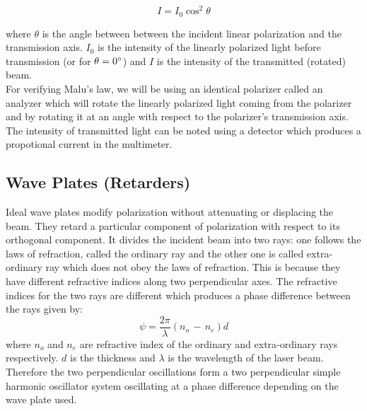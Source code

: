 		\begin{equation}
			I= I_0 \cos^2{\theta}
			\label{eqn:1}
		\end{equation}
		
		where $\theta$ is the angle between between the incident linear polarization and the transmission axis. $I_0$ is the intensity of the linearly polarized light before transmission (or for $\theta=0\degree$) and $I$ is the intensity of the transmitted (rotated) beam. \\

		\vspace{-3mm}
		For verifying Malu's law, we will be using an identical polarizer called an analyzer which will rotate the linearly polarized light coming from the polarizer and by rotating it at an angle with respect to the polarizer's transmission axis. The intensity of transmitted light can be noted using a detector which produces a propotional current in the multimeter.

	\subsection{Wave Plates (Retarders)}

		Ideal wave plates modify polarization without attenuating or displacing the beam. They retard a particular component of polarization with respect to its orthogonal component. It divides the incident beam into two rays:  one follows the laws of refraction, called the ordinary ray and the other one is called extra-ordinary ray which does not obey the laws of refraction. This is because they have different refractive indices along two perpendicular axes. The refractive indices for the two rays are different which produces a phase difference between the rays given by:
		$$ \psi = \frac{2\pi}{\lambda}(n_o\,-\,n_e)d$$
		where $n_o$ and $n_e$ are refractive index of the ordinary and extra-ordinary rays respectively. $d$ is the thickness and $\lambda$ is the wavelength of the laser beam. Therefore the two perpendicular oscillations form a two perpendicular simple harmonic oscillator system oscillating at a phase difference depending on the wave plate used. 


